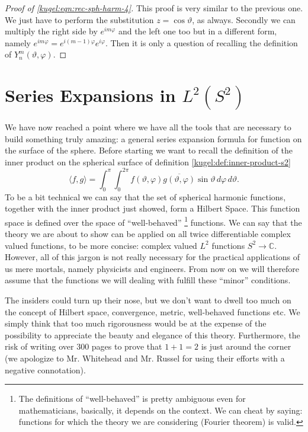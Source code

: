 \begin{proof}[Proof of \eqref{kugel:eqn:rec-sph-harm-4}]
  This proof is very similar to the previous one. We just have to perform the
  substitution $z = \cos \vartheta$, as always. Secondly we can multiply the
  right side by $e^{im\varphi}$ and the left one too but in a different form,
  namely $e^{im\varphi}=e^{i(m-1)\varphi}e^{i\varphi}$. Then it is only a
  question of recalling the definition of $Y^m_n(\vartheta, \varphi)$.
\end{proof}

\section{Series Expansions in $L^2(S^2)$}
\label{kugel:sec:expansion}

We have now reached a point where we have all the tools that are necessary to
build something truly amazing: a general series expansion formula for function
on the surface of the sphere.  Before starting we want to recall the definition
of the inner product on the spherical surface of definition
\ref{kugel:def:inner-product-s2}
\begin{equation*}
  \langle f, g \rangle
  = \int_{0}^\pi \int_0^{2\pi}
    f(\vartheta, \varphi) \overline{g(\vartheta, \varphi)}
    \sin \vartheta \, d\varphi \, d\vartheta.
\end{equation*}
To be a bit technical we can say that the set of spherical harmonic functions,
together with the inner product just showed, form a Hilbert Space. This function
space is defined over the space of ``well-behaved'' \footnote{The definitions of
``well-behaved'' is pretty ambiguous even for mathematicians, basically, it
depends on the context. We can cheat by saying: functions for which the theory
we are considering (Fourier theorem) is valid.} functions.  We can say that the
theory we are about to show can be applied on all twice differentiable complex
valued functions, to be more concise: complex valued $L^2$ functions $S^2 \to
\mathbb{C}$. However, all of this jargon is not really necessary for the
practical applications of us mere mortals, namely physicists and engineers.
From now on we will therefore assume that the functions we will dealing with
fulfill these ``minor'' conditions.

The insiders could turn up their nose, but we don't want to dwell too much on
the concept of Hilbert space, convergence, metric, well-behaved functions etc.
We simply think that too much rigorousness would be at the expense of the
possibility to appreciate the beauty and elegance of this theory.  Furthermore,
the risk of writing over 300 pages to prove that $1+1=2$ is just around the
corner (we apologize to Mr. Whitehead and Mr. Russel for using their efforts
\cite{principia-mathematica} with a negative connotation).

